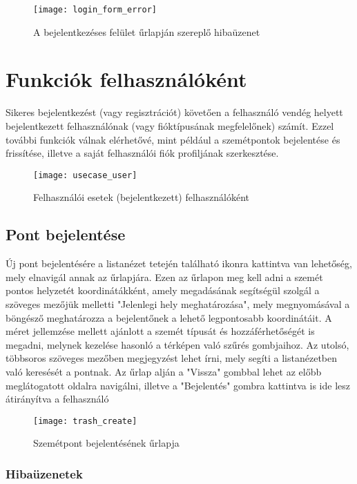 \begin{figure}[H]
	\centering
	\texttt{[image: login\_form\_error]}
	\caption{A bejelentkezéses felület űrlapján szereplő hibaüzenet}
	\label{fig:login_form_error}
\end{figure}

\section{Funkciók felhasználóként}

Sikeres bejelentkezést (vagy regisztrációt) követően a felhasználó vendég helyett bejelentkezett felhasználónak (vagy fióktípusának megfelelőnek) számít. Ezzel további funkciók válnak elérhetővé, mint például a szemétpontok bejelentése és frissítése, illetve a saját felhasználói fiók profiljának szerkesztése.

\begin{figure}[H]
	\centering
	\texttt{[image: usecase\_user]}
	\caption{Felhasználói esetek (bejelentkezett) felhasználóként}
	\label{fig:usecase_user}
\end{figure}

\subsection{Pont bejelentése}

Új pont bejelentésére a listanézet tetején található  ikonra kattintva van lehetőség, mely elnavigál annak az űrlapjára. Ezen az űrlapon meg kell adni a szemét pontos helyzetét koordinátákként, amely megadásának segítségül szolgál a szöveges mezőjük melletti "Jelenlegi hely meghatározása", mely megnyomásával a böngésző meghatározza a bejelentőnek a lehető legpontosabb koordinátáit. A méret jellemzése mellett ajánlott a szemét típusát és hozzáférhetőségét is megadni, melynek kezelése hasonló a térképen való szűrés gombjaihoz. Az utolsó, többsoros szöveges mezőben megjegyzést lehet írni, mely segíti a listanézetben való keresését a pontnak. Az űrlap alján a "Vissza" gombbal lehet az előbb meglátogatott oldalra navigálni, illetve a "Bejelentés" gombra kattintva is ide lesz átirányítva a felhasználó

\begin{figure}[H]
	\centering
	\texttt{[image: trash\_create]}
	\caption{Szemétpont bejelentésének űrlapja}
	\label{fig:trash_create}
\end{figure}

\subsubsection{Hibaüzenetek}
\label{subsubsec:trash_create_errors}

